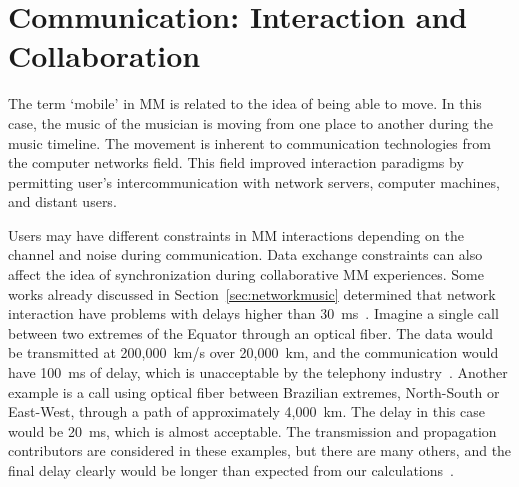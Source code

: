 \section{Communication: Interaction and Collaboration}
\label{sec:communication}

The term `mobile' in MM is related to the idea of being able to move.
In this case, the music of the musician is moving from one place to another during the music timeline.
The movement is inherent to communication technologies from the computer networks field.
This field improved interaction paradigms by permitting user's intercommunication with network servers, computer machines, and distant users.

Users may have different constraints in MM interactions depending on the channel and noise during communication.
Data exchange constraints can also affect the idea of synchronization during collaborative MM experiences.
Some works already discussed in Section~\ref{sec:networkmusic} determined that network interaction have problems with delays higher than 30~ms~\cite{Lago2004thequest}.
Imagine a single call between two extremes of the Equator through an optical fiber.
The data would be transmitted at 200,000~km/s over 20,000~km, and the communication would have 100~ms of delay, which is unacceptable by the telephony industry~\citep{Cheshire1996latency}.
Another example is a call using optical fiber between Brazilian extremes, North-South or East-West, through a path of approximately 4,000~km.
The delay in this case would be 20~ms, which is almost acceptable.
The transmission and propagation contributors are considered in these examples, but there are many others, and the final delay clearly would be longer than expected from our calculations~\citep[p.~8831]{Rottondi2016overview}.

